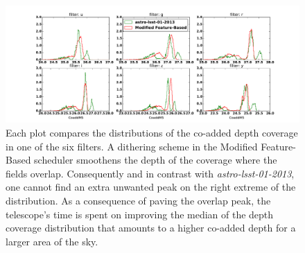 \documentclass[12pt]{aastex62}
\theoremstyle{definition}
\begin{document}
\begin{figure}[h!]
\centering
\includegraphics[width=1.0\linewidth]{Figures/Co_addedHist10yrs.pdf}
\caption{Each plot compares the distributions of the co-added depth coverage in one of the six filters. A dithering scheme in the Modified Feature-Based scheduler smoothens the depth of the coverage where the fields overlap. Consequently and in contrast with \textit{astro-lsst-01-2013}, one cannot find an extra unwanted peak on the right extreme of the distribution. As a consequence of paving the overlap peak, the telescope's time is spent on improving the median of the depth coverage distribution that amounts to a higher co-added depth for a larger area of the sky.}
\label{fig_10yrs_hist}
\end{figure}
\end{document}
